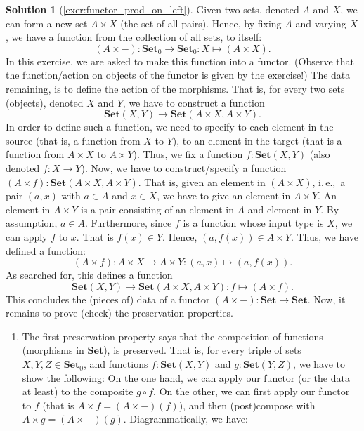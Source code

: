 \documentclass[a4paper,11pt, oneside,titlepage=false]{scrbook}
\theoremstyle{plain}
\theoremstyle{definition}
\newtheorem{solution}[thm]{Solution}
\newcommand{\Catb}[1]{\mathbf{#1}}
\newcommand{\SET}{\Catb{Set}}
\newcommand{\Ob}[1]{{#1}_0}
\newcommand{\CHom}[3]{{#1}(#2,#3)}
\begin{document}
\begin{solution}[\cref{exer:functor_prod_on_left}]\label{sol:functor_prod_on_left}
	Given two sets, denoted $A$ and $X$, we can form a new set $A \times X$ (the set of all pairs).
	Hence, by fixing $A$ and varying $X$, we have a function from the collection of all sets, to itself:
	\[
		(A \times -) : \Ob{\SET} \to \Ob{\SET} : X \mapsto (A \times X).
	\]
	In this exercise, we are asked to make this function into a functor.
	(Observe that the function/action on objects of the functor is given by the exercise!)
	The data remaining, is to define the action of the morphisms.
	That is, for every two sets (objects), denoted $X$ and $Y$, we have to construct a function
	\[
		\CHom{\SET}{X}{Y} \to \CHom{\SET}{A \times X}{A \times Y}.
	\]
	In order to define such a function, we need to specify to each element in the source (that is, a function from $X$ to $Y$), to an element in the target (that is a function from $A \times X$ to $A \times Y$).
	Thus, we fix a function $f : \CHom{\SET}{X}{Y}$ (also denoted $f : X \to Y$).
	Now, we have to construct/specify a function $(A \times f) : \CHom{\SET}{A \times X}{A \times Y}$.
	That is, given an element in $(A \times X)$, i.\,e.,\, a pair $(a, x)$ with $a \in A$ and $x \in X$, we have to give an element in $A \times Y$.
	An element in $A \times Y$ is a pair consisting of an element in $A$ and element in $Y$.
	By assumption, $a \in A$.
	Furthermore, since $f$ is a function whose input type is $X$, we can apply $f$ to $x$.
	That is $f(x) \in Y$.
	Hence, $(a, f(x)) \in A \times Y$.
	Thus, we have defined a function:
	\[
		(A \times f) : A \times X \to A \times Y : (a, x) \mapsto (a, f(x)).
	\]
	As searched for, this defines a function
	\[
		\CHom{\SET}{X}{Y} \to \CHom{\SET}{A \times X}{A \times Y} : f \mapsto (A \times f).
	\]
	This concludes the (pieces of) data of a functor $(A \times -) : \SET \to \SET$.
	Now, it remains to prove (check) the preservation properties.
	\begin{enumerate}
		\item The first preservation property says that the composition of functions (morphisms in $\SET$), is preserved.
		That is, for every triple of sets $X, Y, Z \in \Ob{\SET}$, and functions $f : \SET(X, Y)$ and $g : \SET(Y, Z)$, we have to show the following:
		On the one hand, we can apply our functor (or the data at least) to the composite $g \circ f$.
		On the other, we can first apply our functor to $f$ (that is $A \times f = (A \times -)(f)$), and then (post)compose with $A \times g = (A \times -)(g)$.
		Diagrammatically, we have:

\end{enumerate}
\end{solution}
\end{document}
